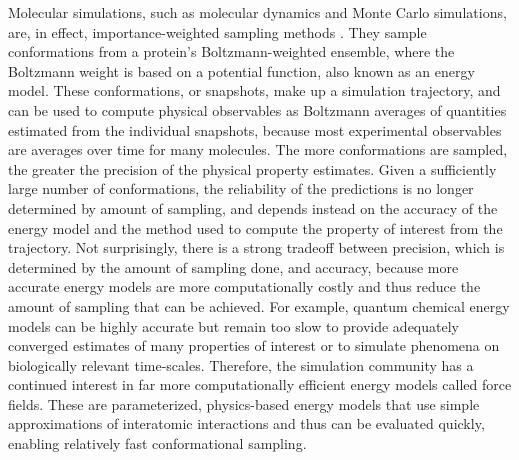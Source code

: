 \documentclass[9pt,review]{livecoms}
\begin{document}
Molecular simulations, such as molecular dynamics and Monte Carlo simulations, are, in effect, importance-weighted sampling methods \cite{frenkel_understanding_2001}.
They sample conformations from a protein’s Boltzmann-weighted ensemble, where the Boltzmann weight is based on a potential function, also known as an energy model.
These conformations, or snapshots, make up a simulation trajectory, and can be used to compute physical observables as Boltzmann averages of quantities estimated from the individual snapshots, because most experimental observables are averages over time for many molecules. The more conformations are sampled, the greater the precision of the physical property estimates.
Given a sufficiently large number of conformations, the reliability of the predictions is no longer determined by amount of sampling, and depends instead on the accuracy of the energy model and the method used to compute the property of interest from the trajectory.
Not surprisingly, there is a strong tradeoff between precision, which is determined by the amount of sampling done, and accuracy, because more accurate energy models are more computationally costly and thus reduce the amount of sampling that can be achieved.
For example, quantum chemical energy models can be highly accurate but remain too slow to provide adequately converged estimates of many properties of interest or to simulate phenomena on biologically relevant time-scales.
Therefore, the simulation community has a continued interest in far more computationally efficient energy models called force fields.
These are parameterized, physics-based energy models that use simple approximations of interatomic interactions and thus can be evaluated quickly, enabling relatively fast conformational sampling.
\end{document}
